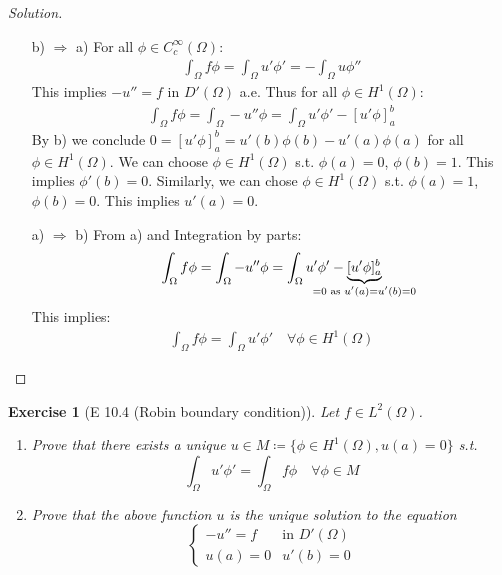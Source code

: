 \documentclass{report}
\theoremstyle{tommy}
\newtheorem{ex}[defn]{Exercise}
\begin{document}
  \begin{proof}[Solution]\
    \begin{itemize}
      \item [b) \(\Rightarrow\) a)] For all \(\phi \in C_c^\infty(\Omega)\):\begin{align*}
        \int_{\Omega} f \phi = \int_\Omega u' \phi' = - \int_\Omega u \phi''
      \end{align*}
      This implies \(- u'' = f\) in \(D'(\Omega)\) a.e. Thus for all \(\phi \in H^1(\Omega)\):
      \begin{align*}
        \int_\Omega f \phi = \int_\Omega - u'' \phi = \int_\Omega u'\phi' - [u' \phi]_a^b
      \end{align*}
      By b) we conclude \(0 = [u' \phi]_a^b = u'(b) \phi(b) - u'(a)\phi(a)\) for all \(\phi \in H^1(\Omega)\). We can choose \(\phi \in H^1(\Omega)\) s.t. \(\phi(a) = 0\), \(\phi(b) = 1\). This implies \(\phi'(b) = 0\). Similarly, we can chose \(\phi \in H^1(\Omega)\) s.t. \(\phi(a) = 1\), \(\phi(b) = 0\). This implies \(u'(a) = 0\).
      \item [a) \(\Rightarrow\) b)] From a) and Integration by parts:
      \begin{align*}
        \int_\Omega f \phi = \int_\Omega - u'' \phi = \int_\Omega u' \phi' - \underbrace{[u'\phi]_a^b}_{\mathclap{= 0 \text{ as } u'(a) = u'(b) = 0}}
      \end{align*}
      This implies:
      \begin{align*}
        \int_\Omega f \phi = \int_\Omega u' \phi' \quad \forall \phi \in H^1(\Omega) 
      \end{align*}\qedhere
    \end{itemize}
  \end{proof}

  
  \begin{ex}[E 10.4 (Robin boundary condition)]
    Let \(f \in L^2(\Omega)\).
    \begin{enumerate}[label=\alph*)]
      \item Prove that there exists a unique \(u \in M \coloneqq \{\phi \in H^1(\Omega) , u(a) = 0\}\) s.t.
      \[\int_\Omega u' \phi' = \int_\Omega f \phi \quad \forall \phi \in M\]
      \item Prove that the above function \(u\) is the unique solution to the equation
      \[\begin{cases}
        -u'' = f &\text{in } D'(\Omega) \\ u(a) = 0 & u'(b) = 0
      \end{cases}\]
    \end{enumerate}
  \end{ex}
\end{document}
